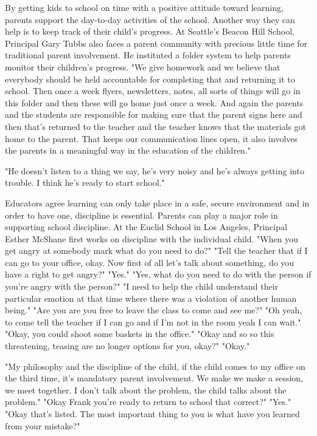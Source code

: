 By getting kids to school on time with a positive attitude toward learning, parents support the day-to-day activities of the school.
Another way they can help is to keep track of their child's progress.
At Seattle's Beacon Hill School, Principal Gary Tubbs also faces a parent community with precious little time for traditional parent involvement.
He instituted a folder system to help parents monitor their children's progress.
"We give homework and we believe that everybody should be held accountable for completing that and returning it to school.
Then once a week flyers, newsletters, notes, all sorts of things will go in this folder and then these will go home just once a week.
And again the parents and the students are responsible for making sure that the parent signs here and then that's returned to the teacher and the teacher knows that the materials got home to the parent.
That keeps our communication lines open, it also involves the parents in a meaningful way in the education of the children."

"He doesn't listen to a thing we say, he's very noisy and he's always getting into trouble.
I think he's ready to start school."

Educators agree learning can only take place in a safe, secure environment and in order to have one, discipline is essential.
Parents can play a major role in supporting school discipline.
At the Euclid School in Los Angeles, Principal Esther McShane first works on discipline with the individual child.
"When you get angry at somebody mark what do you need to do?" "Tell the teacher that if I can go to your office, okay.
Now first of all let's talk about something, do you have a right to get angry?" "Yes." "Yes, what do you need to do with the person if you're angry with the person?" "I need to help the child understand their particular emotion at that time where there was a violation of another human being." "Are you are you free to leave the class to come and see me?" "Oh yeah, to come tell the teacher if I can go and if I'm not in the room yeah I can wait." "Okay, you could shoot some baskets in the office." "Okay and so so this threatening, teasing are no longer options for you, okay?" "Okay."

"My philosophy and the discipline of the child, if the child comes to my office on the third time, it's mandatory parent involvement.
We make we make a session, we meet together.
I don't talk about the problem, the child talks about the problem." "Okay Frank you're ready to return to school that correct?" "Yes." "Okay that's listed.
The most important thing to you is what have you learned from your mistake?"

